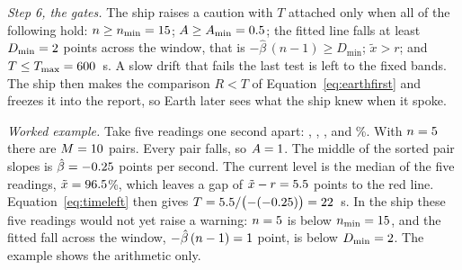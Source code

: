 \emph{Step 6, the gates.} The ship raises a caution with $T$ attached only when all of the following hold: $n \ge n_\text{min} = 15$; $A \ge A_\text{min} = 0.5$; the fitted line falls at least $D_\text{min} = 2$ points across the window, that is $-\hat\beta\,(n-1) \ge D_\text{min}$; $\tilde x > r$; and $T \le T_\text{max} = 600$~s. A slow drift that fails the last test is left to the fixed bands. The ship then makes the comparison $R < T$ of Equation~\ref{eq:earthfirst} and freezes it into the report, so Earth later sees what the ship knew when it spoke.

\emph{Worked example.} Take five readings one second apart: \numWorkedReadingOne, \numWorkedReadingTwo, \numWorkedReadingThree, \numWorkedReadingFour{} and \numWorkedReadingFive\%. With $n = 5$ there are $M = 10$ pairs. Every pair falls, so $A = 1$. The middle of the \numWorkedPairs{} sorted pair slopes is $\hat\beta = -0.25$ points per second. The current level is the median of the five readings, $\tilde x = 96.5$\%, which leaves a gap of $\tilde x - r = 5.5$ points to the red line. Equation~\ref{eq:timeleft} then gives $T = 5.5 / \bigl(-(-0.25)\bigr) = 22$~s. In the ship these five readings would not yet raise a warning: $n = 5$ is below $n_\text{min} = 15$, and the fitted fall across the window, $-\hat\beta\,(n-1) = 1$ point, is below $D_\text{min} = 2$. The example shows the arithmetic only.

